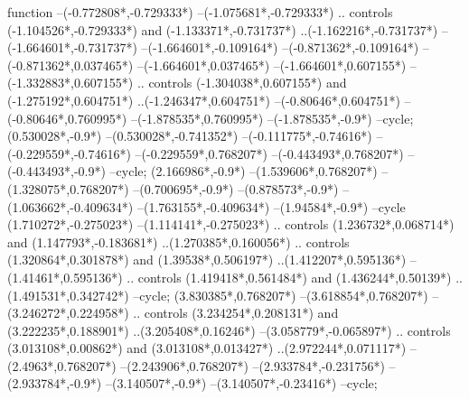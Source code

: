 {\begin{scope}[x=1mm,y=1mm,line width=\SCstroke mm,line cap=round,line join=round]
\begin{SCpart}{function}
--({-0.772808*\SCF},{-0.729333*\SCF})
--({-1.075681*\SCF},{-0.729333*\SCF})
.. controls ({-1.104526*\SCF},{-0.729333*\SCF}) and ({-1.133371*\SCF},{-0.731737*\SCF}) ..({-1.162216*\SCF},{-0.731737*\SCF})
--({-1.664601*\SCF},{-0.731737*\SCF})
--({-1.664601*\SCF},{-0.109164*\SCF})
--({-0.871362*\SCF},{-0.109164*\SCF})
--({-0.871362*\SCF},{0.037465*\SCF})
--({-1.664601*\SCF},{0.037465*\SCF})
--({-1.664601*\SCF},{0.607155*\SCF})
--({-1.332883*\SCF},{0.607155*\SCF})
.. controls ({-1.304038*\SCF},{0.607155*\SCF}) and ({-1.275192*\SCF},{0.604751*\SCF}) ..({-1.246347*\SCF},{0.604751*\SCF})
--({-0.80646*\SCF},{0.604751*\SCF})
--({-0.80646*\SCF},{0.760995*\SCF})
--({-1.878535*\SCF},{0.760995*\SCF})
--({-1.878535*\SCF},{-0.9*\SCF})
--cycle;
 ({0.530028*\SCF},{-0.9*\SCF})
--({0.530028*\SCF},{-0.741352*\SCF})
--({-0.111775*\SCF},{-0.74616*\SCF})
--({-0.229559*\SCF},{-0.74616*\SCF})
--({-0.229559*\SCF},{0.768207*\SCF})
--({-0.443493*\SCF},{0.768207*\SCF})
--({-0.443493*\SCF},{-0.9*\SCF})
--cycle;
 ({2.166986*\SCF},{-0.9*\SCF})
--({1.539606*\SCF},{0.768207*\SCF})
--({1.328075*\SCF},{0.768207*\SCF})
--({0.700695*\SCF},{-0.9*\SCF})
--({0.878573*\SCF},{-0.9*\SCF})
--({1.063662*\SCF},{-0.409634*\SCF})
--({1.763155*\SCF},{-0.409634*\SCF})
--({1.94584*\SCF},{-0.9*\SCF})
--cycle
({1.710272*\SCF},{-0.275023*\SCF})
--({1.114141*\SCF},{-0.275023*\SCF})
.. controls ({1.236732*\SCF},{0.068714*\SCF}) and ({1.147793*\SCF},{-0.183681*\SCF}) ..({1.270385*\SCF},{0.160056*\SCF})
.. controls ({1.320864*\SCF},{0.301878*\SCF}) and ({1.39538*\SCF},{0.506197*\SCF}) ..({1.412207*\SCF},{0.595136*\SCF})
--({1.41461*\SCF},{0.595136*\SCF})
.. controls ({1.419418*\SCF},{0.561484*\SCF}) and ({1.436244*\SCF},{0.50139*\SCF}) ..({1.491531*\SCF},{0.342742*\SCF})
--cycle;
 ({3.830385*\SCF},{0.768207*\SCF})
--({3.618854*\SCF},{0.768207*\SCF})
--({3.246272*\SCF},{0.224958*\SCF})
.. controls ({3.234254*\SCF},{0.208131*\SCF}) and ({3.222235*\SCF},{0.188901*\SCF}) ..({3.205408*\SCF},{0.16246*\SCF})
--({3.058779*\SCF},{-0.065897*\SCF})
.. controls ({3.013108*\SCF},{0.00862*\SCF}) and ({3.013108*\SCF},{0.013427*\SCF}) ..({2.972244*\SCF},{0.071117*\SCF})
--({2.4963*\SCF},{0.768207*\SCF})
--({2.243906*\SCF},{0.768207*\SCF})
--({2.933784*\SCF},{-0.231756*\SCF})
--({2.933784*\SCF},{-0.9*\SCF})
--({3.140507*\SCF},{-0.9*\SCF})
--({3.140507*\SCF},{-0.23416*\SCF})
--cycle;
\end{SCpart}
\end{scope}
}
